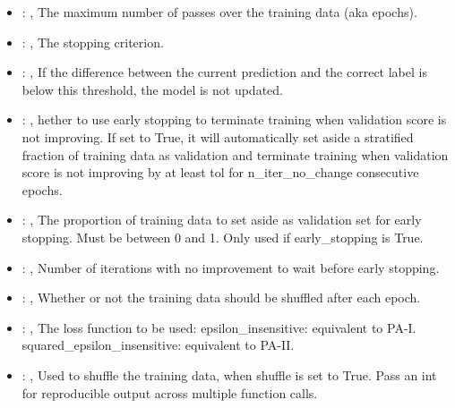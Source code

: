\begin{itemize}
    \item {}: , 
      The maximum number of passes over the training data (aka epochs).

    \item {}: , 
      The stopping criterion.

    \item {}: , 
      If the difference between the current prediction and the
      correct label is below this threshold, the model is not updated.

    \item {}: , 
      hether to use early stopping to terminate training when validation score is not
      improving. If set to True, it will automatically set aside a stratified fraction of training
      data as validation and terminate training when validation score is not improving by at least
      tol for n\_iter\_no\_change consecutive epochs.

    \item {}: , 
      The proportion of training data to set aside as validation set for early stopping.
      Must be between 0 and 1. Only used if early\_stopping is True.

    \item {}: , 
      Number of iterations with no improvement to wait before early stopping.

    \item {}: , 
      Whether or not the training data should be shuffled after each epoch.

    \item {}: , 
      The loss function to be used: epsilon\_insensitive: equivalent to PA-I.
      squared\_epsilon\_insensitive: equivalent to PA-II.

    \item {}: , 
      Used to shuffle the training data, when shuffle is set to
      True. Pass an int for reproducible output across multiple function calls.


\end{itemize}
